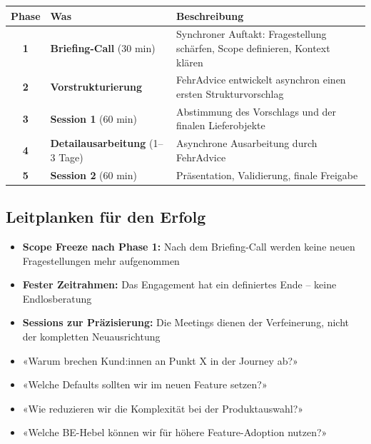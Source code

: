 \documentclass[11pt,a4paper]{article}
\newcommand{\fahead}[1]{\textcolor{fawhite}{\bfseries #1}}
\begin{document}
\begin{center}
\begin{tabular}{clp{8cm}}
\toprule
\rowcolor{fadarkblue}
\fahead{Phase} & \fahead{Was} & \fahead{Beschreibung} \\
\midrule
\rowcolor{fawhite}
\textbf{1} & \textbf{Briefing-Call} (30 min) & Synchroner Auftakt: Fragestellung schärfen, Scope definieren, Kontext klären \\
\rowcolor{falightgray}
\textbf{2} & \textbf{Vorstrukturierung} & FehrAdvice entwickelt asynchron einen ersten Strukturvorschlag \\
\rowcolor{fawhite}
\textbf{3} & \textbf{Session 1} (60 min) & Abstimmung des Vorschlags und der finalen Lieferobjekte \\
\rowcolor{falightgray}
\textbf{4} & \textbf{Detailausarbeitung} (1--3 Tage) & Asynchrone Ausarbeitung durch FehrAdvice \\
\rowcolor{fawhite}
\textbf{5} & \textbf{Session 2} (60 min) & Präsentation, Validierung, finale Freigabe \\
\bottomrule
\end{tabular}
\end{center}

\vspace{0.8cm}

\subsection{Leitplanken für den Erfolg}

\begin{itemize}[leftmargin=*]
    \item \textbf{Scope Freeze nach Phase 1:} Nach dem Briefing-Call werden keine neuen Fragestellungen mehr aufgenommen
    \item \textbf{Fester Zeitrahmen:} Das Engagement hat ein definiertes Ende -- keine Endlosberatung
    \item \textbf{Sessions zur Präzisierung:} Die Meetings dienen der Verfeinerung, nicht der kompletten Neuausrichtung
\end{itemize}

\vspace{0.5cm}

\begin{fasuccessbox}
\begin{itemize}[leftmargin=*]
    \item «Warum brechen Kund:innen an Punkt X in der Journey ab?»
    \item «Welche Defaults sollten wir im neuen Feature setzen?»
    \item «Wie reduzieren wir die Komplexität bei der Produktauswahl?»
    \item «Welche BE-Hebel können wir für höhere Feature-Adoption nutzen?»
\end{itemize}
\end{fasuccessbox}
\end{document}
